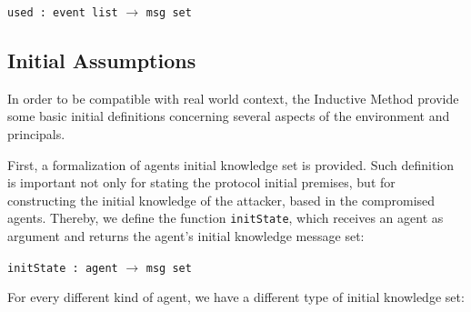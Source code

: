 \begin{center}
  \texttt{used : event list} $\longrightarrow$ \texttt{msg set}
\end{center}

\subsection{Initial Assumptions}
\label{sec:initial-assumptions}
In order to be compatible with real world context, the Inductive Method provide some basic initial definitions concerning several aspects of the environment and principals.

First, a formalization of agents initial knowledge set is provided. Such definition is important not only for stating the protocol initial premises, but for constructing the initial knowledge of the attacker, based in the compromised agents. Thereby, we define the function \texttt{initState}, which receives an agent as argument and returns the agent's initial knowledge message set:

\begin{center}
  \texttt{initState : agent} $\longrightarrow$ \texttt{msg set}
\end{center}

For every different kind of agent, we have a different type of initial knowledge set:

